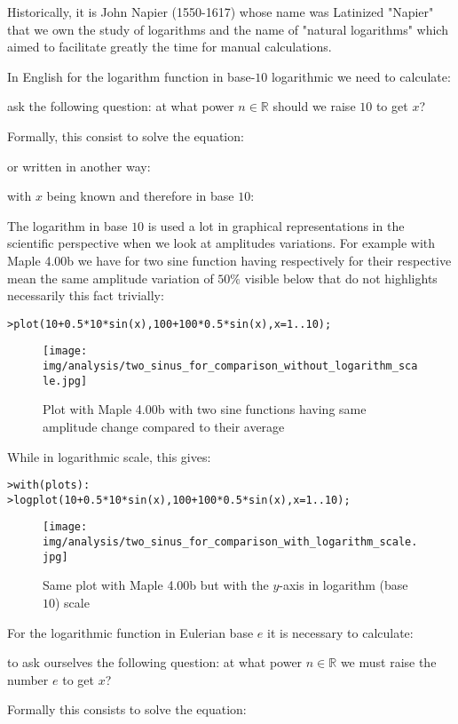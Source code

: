 	\begin{tcolorbox}[title=Remark,colframe=black,arc=10pt]
	Historically, it is John Napier (1550-1617) whose name was Latinized "Napier" that we own the study of logarithms and the name of "natural logarithms" which aimed to facilitate greatly the time for manual calculations.
	\end{tcolorbox}
	In English for the logarithm function in base-$10$ logarithmic we need to calculate:
	
	ask the following question: at what power $n\in \mathbb{R}$ should we raise $10$ to get $x$?
	
	Formally, this consist to solve the equation:
	
	or written in another way:
	
	with $x$ being known and therefore in base $10$:
	
	The logarithm in base $10$ is used a lot in graphical representations in the scientific perspective when we look at amplitudes variations. For example with Maple 4.00b  we have for two sine function  having respectively for their respective mean the same amplitude variation of $50\%$ visible below that do not highlights necessarily this fact trivially:
	
	\texttt{>plot({10+0.5*10*sin(x),100+100*0.5*sin(x)},x=1..10);}
	
	\begin{figure}[H]
		\centering
		\texttt{[image: img/analysis/two\_sinus\_for\_comparison\_without\_logarithm\_scale.jpg]}
		\caption[]{Plot with Maple 4.00b with two sine functions having same amplitude change compared to their average}
	\end{figure}
	While in logarithmic scale, this gives:
	
	\texttt{>with(plots):\\
	>logplot({10+0.5*10*sin(x),100+100*0.5*sin(x)},x=1..10);}
	
	\begin{figure}[H]
		\centering
		\texttt{[image: img/analysis/two\_sinus\_for\_comparison\_with\_logarithm\_scale.jpg]}
		\caption[]{Same plot with Maple 4.00b but with the $y$-axis in logarithm (base $10$) scale}
	\end{figure}
	For the logarithmic function in Eulerian base $e$ it is necessary to calculate:
	
	to ask ourselves the following question: at what power $n\in \mathbb{R}$ we must raise the number $e$ to get $x$?
	
	Formally this consists to solve the equation:
	
